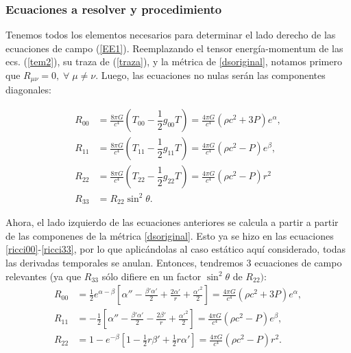 \subsubsection{Ecuaciones a resolver y procedimiento}
Tenemos todos los elementos necesarios para determinar el lado derecho de las ecuaciones de campo (\ref{EE1}). Reemplazando el tensor energía-momentum de las ecs. (\ref{tem2}), su traza de (\ref{traza}), y la métrica de \eqref{dsoriginal}, notamos primero que $R_{\mu\nu}=0,\;\forall\; \mu\neq\nu$. Luego, las ecuaciones no nulas serán las componentes diagonales:

\begin{align}
 R_{00}&=\frac{8\pi G}{c^{4}}\left( T_{00}-\dfrac{1}{2}g_{00}T\right)=
\frac{4\pi G}{c^{4}}(\rho c^2+3P)e^{\alpha},\\
R_{11}&=\frac{8\pi G}{c^{4}}\left( T_{11}-\dfrac{1}{2}g_{11}T\right)=
\frac{4\pi G}{c^{4}}(\rho c^2-P)e^{\beta},\\
R_{22}&=\frac{8\pi G}{c^{4}}\left(T_{22}-\dfrac{1}{2}g_{22}T\right)=
\frac{4\pi G}{c^{4}}(\rho c^2-P)r^2\\
R_{33}&=R_{22}\sin^2\theta.
\end{align}

Ahora, el lado izquierdo de las ecuaciones anteriores se calcula a partir a partir de las componenes de la métrica \eqref{dsoriginal}. Esto ya se hizo en las ecuaciones \eqref{ricci00}-\eqref{ricci33}, por lo que aplicándolas al caso estático aquí considerado, todas las derivadas temporales se anulan. Entonces, tendremos 3 ecuaciones de campo relevantes (ya que $R_{33}$ sólo difiere en un factor $\sin^2\theta$ de $R_{22})$:
\begin{align}
R_{00}&=\frac{1}{2}e^{\alpha-\beta}\left[\alpha''-\frac{\beta'\alpha'}{2}+\frac{2\alpha'}{r}+\frac{\alpha'^2}{2}\right]=\frac{4\pi G}{c^{4}}\left( \rho c^2+3P\right)e^{\alpha},\label{ricci0}\\
R_{11}&=-\frac{1}{2}\left[\alpha''-\frac{\beta'\alpha'}{2}-\frac{2\beta'}{r}+\frac{\alpha'^2}{2}\right]=\frac{4\pi G}{c^{4}}\left( \rho c^2-P\right)e^{\beta},\label{ricci1} \\
R_{22}&=1-e^{-\beta}\left[1-\frac{1}{2}r\beta'+\frac{1}{2}r\alpha'\right]=\frac{4\pi G}{c^{4}}\left( \rho c^2-P\right)r^2. \label{ricci2}
\end{align}

